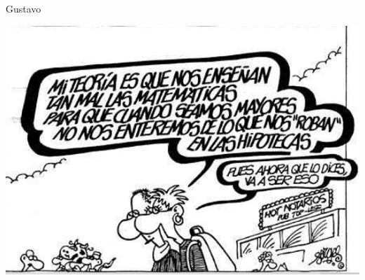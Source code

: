 \begin{opin}{\guscolor}{Gustavo}
\begin{minipage}[hbtp]{1.0\linewidth}
	\centering
	\includegraphics[width=0.6\linewidth]{img/chistegus.png}
\end{minipage}

\end{opin}






